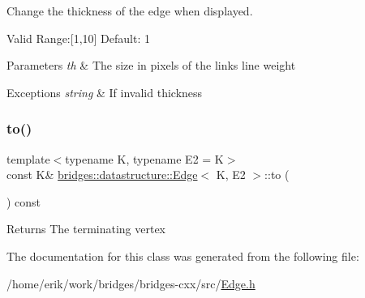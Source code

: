 Change the thickness of the edge when displayed. 

Valid Range\+:\mbox{[}1,10\mbox{]} Default\+: 1


\begin{DoxyParams}{Parameters}
{\em th} & The size in pixels of the link\textquotesingle{}s line weight \\
\hline
\end{DoxyParams}

\begin{DoxyExceptions}{Exceptions}
{\em string} & If invalid thickness \\
\hline
\end{DoxyExceptions}
\mbox{\label{classbridges_1_1datastructure_1_1_edge_a2cece2762a29e3fc18859e0c725eee82}} 
\subsubsection{\texorpdfstring{to()}{to()}}
{\footnotesize\ttfamily template$<$typename K, typename E2 = K$>$ \\
const K\& \hyperlink{classbridges_1_1datastructure_1_1_edge}{bridges\+::datastructure\+::\+Edge}$<$ K, E2 $>$\+::to (\begin{DoxyParamCaption}{ }\end{DoxyParamCaption}) const\hspace{0.3cm}{\ttfamily [inline]}}

\begin{DoxyReturn}{Returns}
The terminating vertex 
\end{DoxyReturn}


The documentation for this class was generated from the following file\+:\begin{DoxyCompactItemize}
\item 
/home/erik/work/bridges/bridges-\/cxx/src/\hyperlink{_edge_8h}{Edge.\+h}\end{DoxyCompactItemize}
